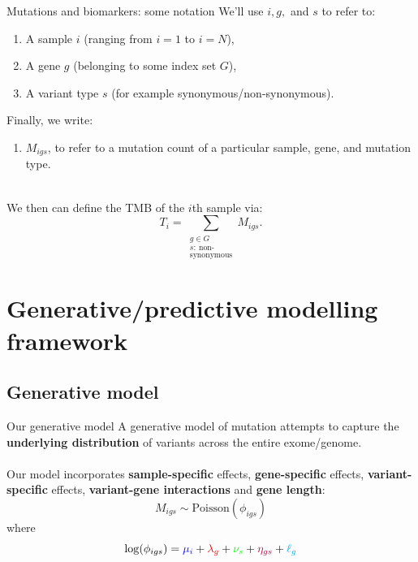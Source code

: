 \documentclass{beamer}
\begin{document}
\begin{frame}{Mutations and biomarkers: some notation}
We'll use $i,g,$ and $s$ to refer to:
\begin{enumerate}
    \item A sample $i$ (ranging from $i=1$ to $i=N$),
    \item A gene $g$ (belonging to some index set $G$),
    \item A variant type $s$ (for example synonymous/non-synonymous).
\end{enumerate}
Finally, we write:
\begin{enumerate}[4]  
    \item $M_{igs}$, to refer to a mutation count of a particular sample, gene, and mutation type.
\end{enumerate} 
~\\
We then can define the TMB of the $i$th sample via:
\[
T_i = \sum_{\substack{g \in G \\ s: \ \text{non-}\\ \text{synonymous}}} M_{igs}.
\]

\end{frame}

\section{Generative/predictive modelling framework}
\subsection{Generative model}

\begin{frame}{Our generative model}
A generative model of mutation attempts to capture the \textbf{underlying distribution} of variants across the entire exome/genome. \\
~\\
Our model incorporates \color{blue}\textbf{sample-specific} \color{black} effects, \color{red} \textbf{gene-specific} \color{black} effects, \color{green} \textbf{variant-specific} \color{black} effects, \color{purple} \textbf{variant-gene interactions} \color{black} and \color{cyan}\textbf{gene length}\color{black}:
\begin{equation}
    M_{igs} \sim \text{Poisson}(\phi_{igs})
\end{equation}
where 
\begin{equation}
\log(\phi_{igs}) = \color{blue}\mu_i \color{black}+ \color{red}\lambda_g \color{black} + \color{green} \nu_s \color{black} +  \color{purple} \eta_{gs} \color{black} + \color{cyan}\ell_g \color{black}
\end{equation} 
\end{frame}
\end{document}
